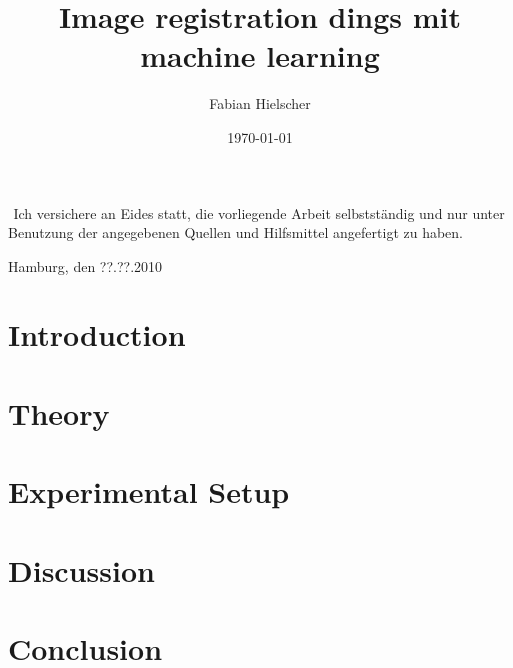 \documentclass[
a4paper, 
12pt,
grayscalebody, %
abstract=on,
twoside, BCOR10mm, 12pt, DIV13,headinclude, footexclude, final, abstracton, openright
]{ibireprt}
\author{Fabian Hielscher}
\title{Image registration dings mit machine learning}
\date{\today}
\numberwithin{equation}{chapter}
\numberwithin{table}{chapter}
\numberwithin{figure}{chapter}
\numberwithin{algorithm}{chapter}
\numberwithin{example}{chapter}
\numberwithin{example}{chapter}
\begin{document}
	\maketitle
	
	\newpage
	${}^{}$
	\vfill
	\noindent
	Ich versichere an Eides statt, die vorliegende Arbeit selbstständig und nur unter Benutzung der angegebenen Quellen und Hilfsmittel angefertigt zu haben.\\
	\vspace{1.5cm}
	
	\noindent
	Hamburg, den ??.??.2010
	\thispagestyle{empty}
	\newpage
	\newpage
	
	\setlength{\parskip}{1.5mm }
	
	
	
	
	\setcounter{tocdepth}{2}
	\tableofcontents
	\begin{abstract}
	
	\end{abstract}
	
	\chapter{Introduction}
	\chapter{Theory}
	
	
	\chapter{Experimental Setup}
	
	\chapter{Discussion}
	
	
	\chapter{Conclusion}
	
\end{document}
